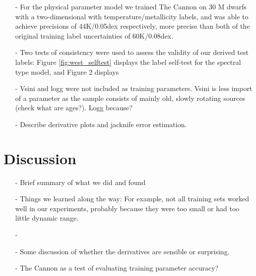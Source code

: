 \documentclass[modern]{aastex62}
\begin{document}
\begin{enumerate}
\item[-] For the physical parameter model we trained The Cannon on 30 M dwarfs with a two-dimensional with temperature/metallicity labels, and was able to achieve precisions of 44K/0.05dex respectively, more precise than both of the original training label uncertainties of 60K/0.08dex.

\item[-] Two tests of consistency were used to assess the validity of our derived test labels: Figure \ref{fig:west_selftest} displays the label self-test for the spectral type model, and Figure 2 displays 

\item[-] Vsini and logg were not included as training parameters. Vsini is less import of a parameter as the sample consists of mainly old, slowly rotating sources (check what are ages?). Logg because?
\end{enumerate}

\begin{enumerate}
\item[-] Describe derivative plots and jacknife error estimation.
\end{enumerate}


\section{Discussion} \label{sec:discussion}

\begin{enumerate}
\item[-] Brief summary of what we did and found

\item[-] Things we learned along the way: For example, not all training sets worked well in our experiments, probably because they were too small or had too little dynamic range.

\item[-] \color{gcolor}{HOGG: Some discussion of precision and accuracy: The Cannon can produce precise results, but is only as accurate as its training set.}\color{black}

\item[-] Some discussion of whether the derivatives are sensible or surprising. \color{red}{Add derivative plots.}\color{black}

\item[-] The Cannon as a test of evaluating training parameter accuracy? 
\end{enumerate}
\end{document}
